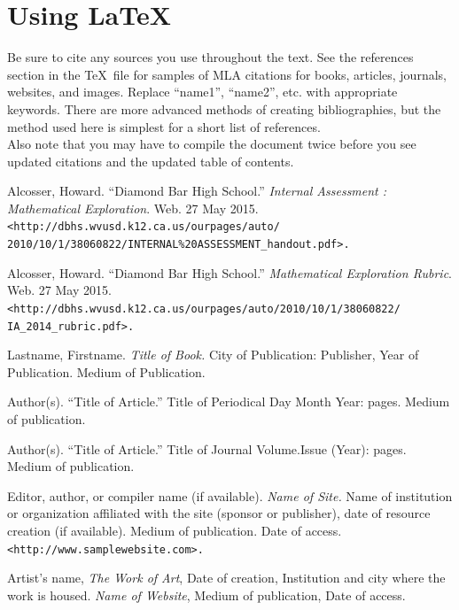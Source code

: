 \documentclass[11pt]{article}
\begin{document}
\section{Using \LaTeX}
Be sure to cite any sources you use throughout the text. See the references section in the \TeX\, file for samples of MLA citations for books\cite{name1}, articles\cite{name2}, journals\cite{name3}, websites\cite{name4}, and images\cite{name5}. Replace ``name1'', ``name2'', etc. with appropriate keywords. There are more advanced methods of creating bibliographies, but the method used here is simplest for a short list of references.\\

Also note that you may have to compile the document twice before you see updated citations and the updated table of contents. 

\pagebreak[4]
\begin{flushleft}
\begin{thebibliography}{}

Alcosser, Howard. 
``Diamond Bar High School.''
\textit{Internal Assessment : Mathematical Exploration}. 
Web. 27 May 2015.
\texttt{<http://dbhs.wvusd.k12.ca.us/ourpages/auto/\\2010/10/1/38060822/INTERNAL\%20ASSESSMENT\_handout.pdf>.}

Alcosser, Howard. 
``Diamond Bar High School.'' 
\textit{Mathematical Exploration Rubric}. 
Web. 27 May 2015.
\texttt{<http://dbhs.wvusd.k12.ca.us/ourpages/auto/2010/10/1/38060822/\\IA\_2014\_rubric.pdf>.}

Lastname, Firstname. 
\textit{Title of Book.} 
City of Publication: 
Publisher, 
Year of Publication. 
Medium of Publication. %

Author(s). 
``Title of Article.'' 
Title of Periodical 
Day Month Year: 
pages. 
Medium of publication.

Author(s). 
``Title of Article.'' 
Title of Journal 
Volume.Issue (Year): 
pages. 
Medium of publication.

Editor, author, or compiler name (if available). 
\textit{Name of Site.} 
Name of institution or organization affiliated with the site (sponsor or publisher), 
date of resource creation (if available). 
Medium of publication. 
Date of access.
\texttt{<http://www.samplewebsite.com>.}

Artist's name, 
\textit{The Work of Art}, 
Date of creation, 
Institution and city where the work is housed. 
\textit{Name of  Website}, 
Medium of publication, 
Date of access.

\end{thebibliography}
\end{flushleft}
\end{document}
